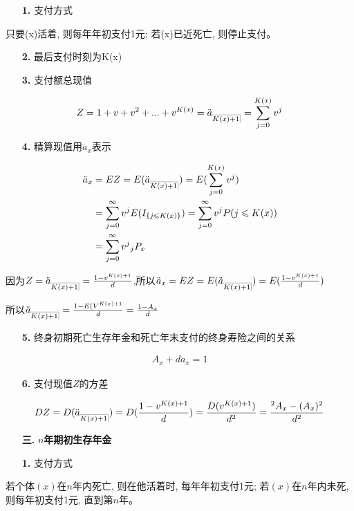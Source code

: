 \documentclass[a4paper,10pt]{ctexbook}
\makeatletter
\newcommand{\hei}{\CJKfamily{hei}}      %
\DeclareRobustCommand{\annu}[1]{_{%
    \def\arraystretch{0}%
    \setlength\arraycolsep{1pt}%
    \setlength\arrayrulewidth{.2pt}%
    \begin{array}[b]{@{}c|}\hline
        \\[\arraycolsep]%
        \scriptstyle #1%
    \end{array}%
}}
\makeatother
\begin{document}
\begin{itemize}
    \item[{\bf\hei 1.}]支付方式
\end{itemize}

只要(x)活着, 则每年年初支付1元; 若(x)已近死亡, 则停止支付。
\begin{itemize}
    \item[{\bf\hei 2.}]最后支付时刻为K(x)
\end{itemize}
\begin{itemize}
    \item[{\bf\hei 3.}]支付额总现值
\end{itemize}
\begin{align*}
    Z=1+v+v^2+...+v^{K(x)}=\ddot a_{\annu {K(x)+1}}=\sum_{j=0}^{K\left( x \right)}{v^j}
\end{align*}
\begin{itemize}
    \item[{\bf\hei 4.}]精算现值用$\ddot a_x$表示
\end{itemize}
\begin{align*}
    \ddot a_x & =EZ =E(\ddot a_{\annu {K(x)+1}})=E(\sum_{j=0}^{K\left( x \right)}{v^j})                        \\
              & =\sum_{j=0}^{\infty}{v^j}E(I_{\{j\leqslant K(x)\}})=\sum_{j=0}^{\infty}{v^j}P(j\leqslant K(x)) \\
              & =\sum_{j=0}^{\infty}{v^j}{}_j P_x                                                              \\
\end{align*}

因为$Z=\ddot a_{\annu {K(x)+1}}=\frac{1-v^{K(x)+1}}{d}$,所以$\ddot a_x=EZ=E(\ddot a_{\annu {K(x)+1}})=E(\frac{1-v^{K(x)+1}}{d})$

所以$\ddot a_{\annu {K(x)+1}}=\frac{1-E(V^{K(x)+1}}{d}=\frac{1-A_x}{d}$

\begin{itemize}
    \item[{\bf\hei 5.}]终身初期死亡生存年金和死亡年末支付的终身寿险之间的关系
\end{itemize}
\begin{align*}
    A_x+d \ddot a_x=1
\end{align*}
\begin{itemize}
    \item[{\bf\hei 6.}]支付现值$Z$的方差
\end{itemize}
\begin{align*}
    DZ=D(\ddot a_{\annu {K(x)+1}})=D(\frac{1-v^{K(x)+1}}{d})=\frac{D(v^{K(x)+1})}{d^2}=\frac{{}^2A_x-(A_x)^2}{d^2}
\end{align*}
\begin{itemize}
    \item[{\bf\hei 三.}]{\bf\hei $n$年期初生存年金}
\end{itemize}
\begin{itemize}
    \item[{\bf\hei 1.}]支付方式
\end{itemize}
若个体$(x)$在$n$年内死亡, 则在他活着时, 每年年初支付1元; 若$(x)$在$n$年内未死, 则每年初支付1元, 直到第$n$年。
\end{document}
